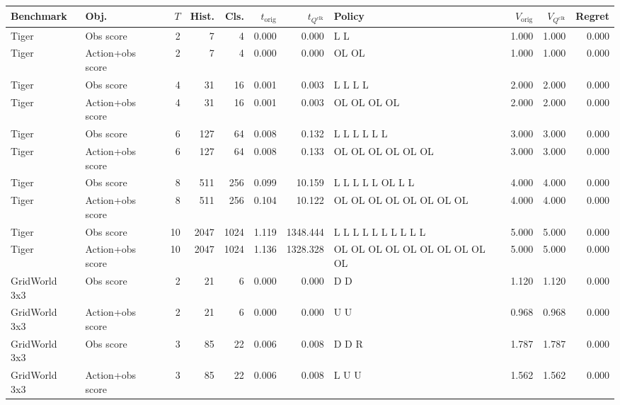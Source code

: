 \begin{tabular}{llrrrrrp{3.2cm}rrr}
\toprule
Benchmark & Obj. & $T$ & Hist. & Cls. & $t_{\mathrm{orig}}$ & $t_{Q^{\mathrm{clk}}}$ & Policy & $V_{\mathrm{orig}}$ & $V_{Q^{\mathrm{clk}}}$ & Regret\\
\midrule
Tiger & Obs score & 2 & 7 & 4 & 0.000 & 0.000 & L L & 1.000 & 1.000 & 0.000\\
Tiger & Action+obs score & 2 & 7 & 4 & 0.000 & 0.000 & OL OL & 1.000 & 1.000 & 0.000\\
Tiger & Obs score & 4 & 31 & 16 & 0.001 & 0.003 & L L L L & 2.000 & 2.000 & 0.000\\
Tiger & Action+obs score & 4 & 31 & 16 & 0.001 & 0.003 & OL OL OL OL & 2.000 & 2.000 & 0.000\\
Tiger & Obs score & 6 & 127 & 64 & 0.008 & 0.132 & L L L L L L & 3.000 & 3.000 & 0.000\\
Tiger & Action+obs score & 6 & 127 & 64 & 0.008 & 0.133 & OL OL OL OL OL OL & 3.000 & 3.000 & 0.000\\
Tiger & Obs score & 8 & 511 & 256 & 0.099 & 10.159 & L L L L L OL L L & 4.000 & 4.000 & 0.000\\
Tiger & Action+obs score & 8 & 511 & 256 & 0.104 & 10.122 & OL OL OL OL OL OL OL OL & 4.000 & 4.000 & 0.000\\
Tiger & Obs score & 10 & 2047 & 1024 & 1.119 & 1348.444 & L L L L L L L L L L & 5.000 & 5.000 & 0.000\\
Tiger & Action+obs score & 10 & 2047 & 1024 & 1.136 & 1328.328 & OL OL OL OL OL OL OL OL OL OL & 5.000 & 5.000 & 0.000\\
GridWorld 3x3 & Obs score & 2 & 21 & 6 & 0.000 & 0.000 & D D & 1.120 & 1.120 & 0.000\\
GridWorld 3x3 & Action+obs score & 2 & 21 & 6 & 0.000 & 0.000 & U U & 0.968 & 0.968 & 0.000\\
GridWorld 3x3 & Obs score & 3 & 85 & 22 & 0.006 & 0.008 & D D R & 1.787 & 1.787 & 0.000\\
GridWorld 3x3 & Action+obs score & 3 & 85 & 22 & 0.006 & 0.008 & L U U & 1.562 & 1.562 & 0.000\\
\bottomrule
\end{tabular}